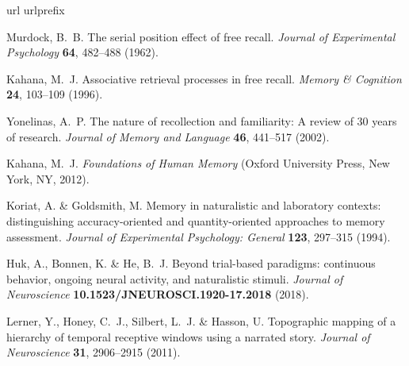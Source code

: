 \documentclass[10pt]{article}
\begin{document}
\begin{thebibliography}{10}
\expandafter\ifx\csname url\endcsname\relax
  \def\url#1{\texttt{#1}}\fi
\expandafter\ifx\csname urlprefix\endcsname\relax\def\urlprefix{URL }\fi
\providecommand{\bibinfo}[2]{#2}
\providecommand{\eprint}[2][]{\url{#2}}

\bibinfo{author}{Murdock, B.~B.}
\newblock \bibinfo{title}{The serial position effect of free recall}.
\newblock \emph{\bibinfo{journal}{Journal of Experimental Psychology}}
  \textbf{\bibinfo{volume}{64}}, \bibinfo{pages}{482--488}
  (\bibinfo{year}{1962}).

\bibinfo{author}{Kahana, M.~J.}
\newblock \bibinfo{title}{Associative retrieval processes in free recall}.
\newblock \emph{\bibinfo{journal}{Memory \& Cognition}}
  \textbf{\bibinfo{volume}{24}}, \bibinfo{pages}{103--109}
  (\bibinfo{year}{1996}).

\bibinfo{author}{Yonelinas, A.~P.}
\newblock \bibinfo{title}{The nature of recollection and familiarity: A review
  of 30 years of research}.
\newblock \emph{\bibinfo{journal}{Journal of Memory and Language}}
  \textbf{\bibinfo{volume}{46}}, \bibinfo{pages}{441--517}
  (\bibinfo{year}{2002}).

\bibinfo{author}{Kahana, M.~J.}
\newblock \emph{\bibinfo{title}{Foundations of Human Memory}}
  (\bibinfo{publisher}{Oxford University Press}, \bibinfo{address}{New York,
  NY}, \bibinfo{year}{2012}).

\bibinfo{author}{Koriat, A.} \& \bibinfo{author}{Goldsmith, M.}
\newblock \bibinfo{title}{Memory in naturalistic and laboratory contexts:
  distinguishing accuracy-oriented and quantity-oriented approaches to memory
  assessment}.
\newblock \emph{\bibinfo{journal}{Journal of Experimental Psychology: General}}
  \textbf{\bibinfo{volume}{123}}, \bibinfo{pages}{297--315}
  (\bibinfo{year}{1994}).

\bibinfo{author}{Huk, A.}, \bibinfo{author}{Bonnen, K.} \& \bibinfo{author}{He,
  B.~J.}
\newblock \bibinfo{title}{Beyond trial-based paradigms: continuous behavior,
  ongoing neural activity, and naturalistic stimuli}.
\newblock \emph{\bibinfo{journal}{Journal of Neuroscience}}
  \textbf{\bibinfo{volume}{10.1523/JNEUROSCI.1920-17.2018}}
  (\bibinfo{year}{2018}).

\bibinfo{author}{Lerner, Y.}, \bibinfo{author}{Honey, C.~J.},
  \bibinfo{author}{Silbert, L.~J.} \& \bibinfo{author}{Hasson, U.}
\newblock \bibinfo{title}{Topographic mapping of a hierarchy of temporal
  receptive windows using a narrated story}.
\newblock \emph{\bibinfo{journal}{Journal of Neuroscience}}
  \textbf{\bibinfo{volume}{31}}, \bibinfo{pages}{2906--2915}
  (\bibinfo{year}{2011}).


\end{thebibliography}
\end{document}
